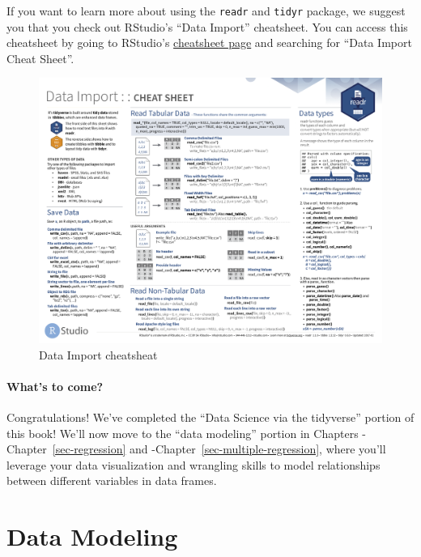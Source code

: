 \documentclass[
  letterpaper,
  DIV=11,
  numbers=noendperiod]{scrreprt}
\theoremstyle{definition}
\theoremstyle{remark}
\begin{document}
If you want to learn more about using the \texttt{readr} and
\texttt{tidyr} package, we suggest you that you check out RStudio's
``Data Import'' cheatsheet. You can access this cheatsheet by going to
RStudio's
\href{https://www.rstudio.com/resources/cheatsheets/}{cheatsheet page}
and searching for ``Data Import Cheat Sheet''.

\begin{figure}

{\centering \includegraphics{images/import_cheatsheet-1.png}

}

\caption{Data Import cheatsheat}

\end{figure}

\hypertarget{whats-to-come-1}{%
\subsection{What's to come?}\label{whats-to-come-1}}

Congratulations! We've completed the ``Data Science via the tidyverse''
portion of this book! We'll now move to the ``data modeling'' portion in
Chapters -Chapter~\ref{sec-regression} and
-Chapter~\ref{sec-multiple-regression}, where you'll leverage your data
visualization and wrangling skills to model relationships between
different variables in data frames.

\part{Data Modeling}
\end{document}
